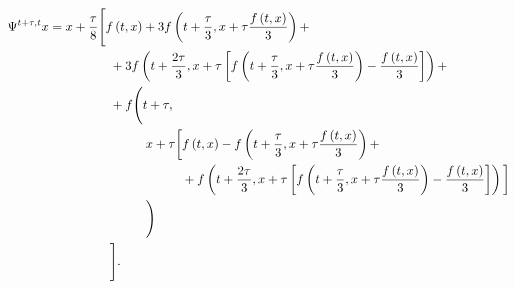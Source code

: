 \documentclass[english, parskip=full]{scrartcl}
\begin{document}
\begin{align*}
\Psi^{t+\tau,t}x &= x + \frac{\tau}{8} \Bigg[ f\left( t, x \right) + 3f\left( t + \frac{\tau}{3}, x + \tau \frac{f\left( t, x \right)}{3} \right) + \\
&\hspace{1.7cm} + 3f\left( t + \frac{2\tau}{3}, x + \tau \left[ f\left( t + \frac{\tau}{3}, x + \tau \frac{f\left( t, x \right)}{3} \right) - \frac{f\left( t, x \right)}{3} \right] \right) + \\
&\hspace{1.7cm} + f\Bigg( t + \tau, \\
&\hspace{2.7cm} x + \tau \bigg[ f\left( t, x \right) - f\left( t + \frac{\tau}{3}, x + \tau \frac{f\left( t, x \right)}{3} \right) + \\
&\hspace{3.7cm}+ f\left( t + \frac{2\tau}{3}, x + \tau \left[ f\left( t + \frac{\tau}{3}, x + \tau \frac{f\left( t, x \right)}{3} \right) - \frac{f\left( t, x \right)}{3} \right] \right) \bigg] \\
&\hspace{2.7cm} \Bigg) \\
&\hspace{1.7cm} \Bigg].
\end{align*}
\end{document}
